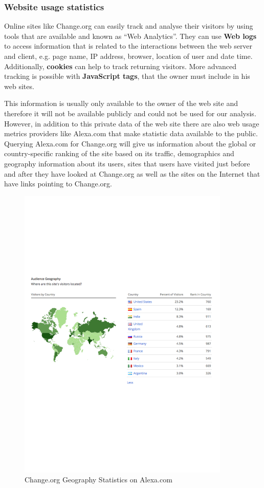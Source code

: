\subsubsection{Website usage statistics}
Online sites like Change.org can easily track and analyse their visitors by using tools that are available and known as ``Web Analytics''. They can use \textbf{Web logs} to access information that is related to the interactions between the web server and client, e.g. page name, IP address, browser, location of user and date time. Additionally, \textbf{cookies} can help to track returning visitors. More advanced tracking is possible with \textbf{JavaScript tags}, that the owner must include in his web sites. \par \vspace{0.2cm}
This information is usually only available to the owner of the web site and therefore it will not be available publicly and could not be used for our analysis. However, in addition to this private data of the web site there are also web usage metrics providers like Alexa.com \citep{Alexa14a} that make statistic data available to the public. Querying Alexa.com for Change.org \citep{Alexa14b} will give us information about the global or country-specific ranking of the site based on its traffic, demographics and geography information about its users, sites that users have visited just before and after they have looked at Change.org as well as the sites on the Internet that have links pointing to Change.org.  
\begin{figure}[H]
\centering
\includegraphics[width=0.9\textwidth]{assets/ChangeGeoStats.pdf}
\caption{Change.org Geography Statistics on Alexa.com}
\label{fig:change.org_GeoStats}
\end{figure}


